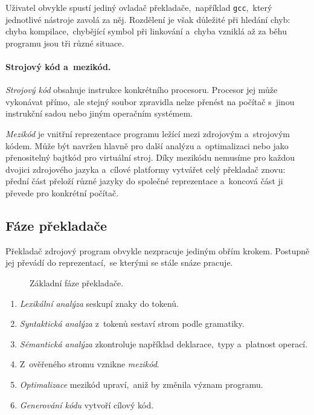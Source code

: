 Uživatel obvykle spustí jediný ovladač překladače,~například \texttt{gcc},~který jednotlivé nástroje zavolá za něj. Rozdělení je však důležité při hledání chyb: chyba kompilace,~chybějící symbol při linkování a~chyba vzniklá až za běhu programu jsou tři různé situace.

\paragraph{Strojový kód a~mezikód.}

\emph{Strojový kód} obsahuje instrukce konkrétního procesoru. Procesor jej může vykonávat přímo,~ale stejný soubor zpravidla nelze přenést na počítač s~jinou instrukční sadou nebo jiným operačním systémem.

\emph{Mezikód} je vnitřní reprezentace programu ležící mezi zdrojovým a~strojovým kódem. Může být navržen hlavně pro další analýzu a~optimalizaci nebo jako přenositelný bajtkód pro virtuální stroj. Díky mezikódu nemusíme pro každou dvojici zdrojového jazyka a~cílové platformy vytvářet celý překladač znovu: přední část přeloží různé jazyky do společné reprezentace a~koncová část ji převede pro konkrétní počítač.

\subsection{Fáze překladače}

Překladač zdrojový program obvykle nezpracuje jediným obřím krokem. Postupně jej převádí do reprezentací,~se kterými se stále snáze pracuje.

\begin{figure}[h]
    \centering
    
    \caption{Základní fáze překladače.}
    \label{fig:faze-prekladace}
\end{figure}

\begin{enumerate}
    \item \emph{Lexikální analýza} seskupí znaky do tokenů.
    \item \emph{Syntaktická analýza} z~tokenů sestaví strom podle gramatiky.
    \item \emph{Sémantická analýza} zkontroluje například deklarace,~typy a~platnost operací.
    \item Z~ověřeného stromu vznikne \emph{mezikód}.
    \item \emph{Optimalizace} mezikód upraví,~aniž by změnila význam programu.
    \item \emph{Generování kódu} vytvoří cílový kód.
\end{enumerate}

